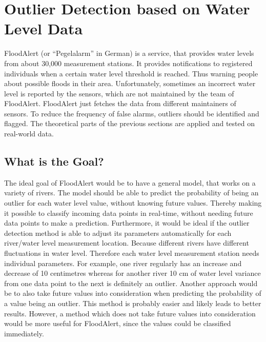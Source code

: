 \chapter{Outlier Detection based on Water Level Data}
FloodAlert (or ``Pegelalarm'' in German) is a service, that provides water levels from about 30,000 measurement stations. It provides notifications to registered individuals when a certain water level threshold is reached. Thus warning people about possible floods in their area. \cite{strassmayrFloodAlertWaterLevels}
\newline
\newline
Unfortunately, sometimes an incorrect water level is reported by the sensors, which are not maintained by the team of FloodAlert. FloodAlert just fetches the data from different maintainers of sensors. To reduce the frequency of false alarms, outliers should be identified and flagged. The theoretical parts of the previous sections are applied and tested on real-world data.
\section{What is the Goal?}
The ideal goal of FloodAlert would be to have a general model, that works on a variety of rivers. The model should be able to predict the probability of being an outlier for each water level value, without knowing future values. Thereby making it possible to classify incoming data points in real-time, without needing future data points to make a prediction. Furthermore, it would be ideal if the outlier detection method is able to adjust its parameters automatically for each river/water level measurement location. Because different rivers have different fluctuations in water level. Therefore each water level measurement station needs individual parameters. For example, one river regularly has an increase and decrease of 10 centimetres whereas for another river 10 cm of water level variance from one data point to the next is definitely an outlier.
\newline
\newline
Another approach would be to also take future values into consideration when predicting the probability of a value being an outlier. This method is probably easier and likely leads to better results. However, a method which does not take future values into consideration would be more useful for FloodAlert, since the values could be classified immediately.

